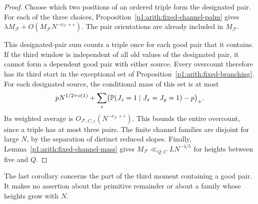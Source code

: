 \begin{proof}
Choose which two positions of an ordered triple form the designated
pair.  For each of the three choices,
Proposition~\ref{p1:arith:fixed-channel-palm} gives
\(\lambda M_{\mathcal F}
 +O(M_{\mathcal F}N^{-\nu_{\mathcal F}+\varepsilon})\).
The pair orientations are already included in \(M_{\mathcal F}\).

This designated-pair sum counts a triple once for each good pair that
it contains.  If the third window is independent of all old values
of the designated pair, it cannot form a dependent good pair with
either source.
Every overcount therefore has its third start in the exceptional set
of Proposition~\ref{p1:arith:fixed-branching}.
For each designated source, the conditional mass of this set is at most
\[
 pN^{1/2+o(1)}
 +\sum_z\bigl(\P(J_z=1\mid J_x=J_y=1)-p\bigr)_+.
\]
Its weighted average is
\(O_{\mathcal F,C,\varepsilon}(N^{-\nu_{\mathcal F}+\varepsilon})\).
This bounds the entire overcount, since a triple has at most three pairs.
The finite channel families are disjoint for large \(N\), by the separation
of distinct reduced slopes.
Finally, Lemma~\ref{p1:arith:fixed-channel-mass} gives
\(M_{\mathcal F}\ll_{Q,C}L N^{-4/5}\) for heights between five and \(Q\).
\end{proof}

The last corollary concerns the part of the third moment containing a
good pair.  It makes no assertion about the primitive remainder or about
a family whose heights grow with \(N\).

